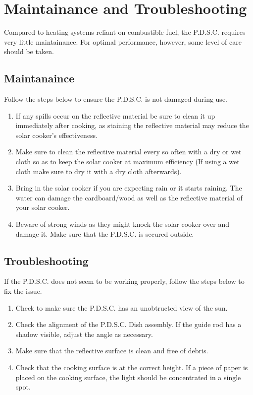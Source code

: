 \documentclass{article}
\begin{document}
    \section{Maintainance and Troubleshooting}
        Compared to heating systems reliant on combustible fuel, the P.D.S.C. requires very little maintainance. For optimal performance, however, some level of care should be taken.
        \subsection{Maintanaince}    
            Follow the steps below to ensure the P.D.S.C. is not damaged during use.
                \begin{enumerate}
                    \item If any spills occur on the reflective material be sure to clean it up immediately after cooking, as staining the reflective material may reduce the solar cooker’s effectiveness.
                    \item Make sure to clean the reflective material every so often with a dry or wet cloth so as to keep the solar cooker at maximum efficiency (If using a wet cloth make sure to dry it with a dry cloth afterwards).
                    \item Bring in the solar cooker if you are expecting rain or it starts raining. The water can damage the cardboard/wood as well as the reflective material of your solar cooker.
                    \item Beware of strong winds as they might knock the solar cooker over and damage it. Make sure that the P.D.S.C. is secured outside.

                \end{enumerate}
        \subsection{Troubleshooting}
            If the P.D.S.C. does not seem to be working properly, follow the steps below to fix the issue.
            \begin{enumerate}
                \item Check to make sure the P.D.S.C. has an unobtructed view of the sun.
                \item Check the alignment of the P.D.S.C. Dish assembly.  If the guide rod has a shadow visible, adjust the angle as necessary.
                \item Make sure that the reflective surface is clean and free of debris.
                \item Check that the cooking surface is at the correct height. If a piece of paper is placed on the cooking surface, the light should be concentrated in a single spot.
            \end{enumerate}
\end{document}

